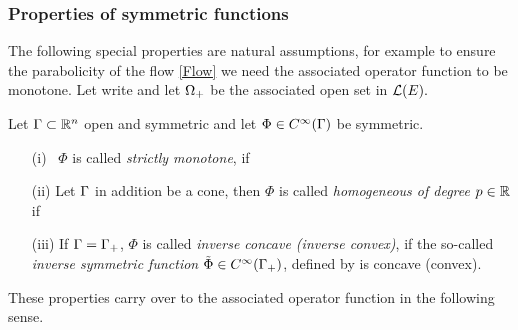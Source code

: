 \subsubsection*{Properties of symmetric functions}
The following special properties are natural assumptions, for example to ensure the parabolicity of the flow \eqref{Flow} we need the associated operator function to be monotone.
Let write
and let $\Omega_{+}$ be the associated open set in $\mathcal{L}(E).$

\begin{defn}\label{PropSymm}
Let $\Gamma\subset\mathbb{R}^{n}$ open and symmetric and let $\Phi\in C^{\infty}(\Gamma)$ be symmetric.
\begin{itemize}
\item[(i)]~$\Phi$ is called {\it{strictly monotone}}, if 
\item[(ii)] Let $\Gamma$ in addition be a cone, then $\Phi$ is called {\it{homogeneous of degree $p\in \mathbb{R}$}} if
\item[(iii)] If $\Gamma=\Gamma_{+}$, $\Phi$ is called {\it{inverse concave (inverse convex)}}, if the so-called {\it{inverse symmetric function}} $\tilde\Phi\in C^{\infty}(\Gamma_{+})$, defined by
is concave (convex). 
\end{itemize}
\end{defn}

These properties carry over to the associated operator function in the following sense.

{}

